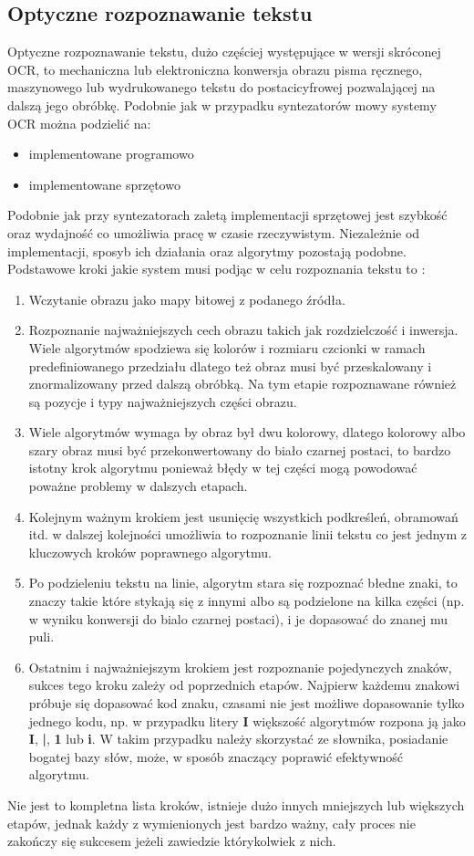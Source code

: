 \subsection{Optyczne rozpoznawanie tekstu}
Optyczne rozpoznawanie tekstu, dużo częściej występujące w wersji skróconej OCR, to mechaniczna lub elektroniczna konwersja obrazu pisma ręcznego, maszynowego lub wydrukowanego tekstu do postacicyfrowej pozwalającej na dalszą jego obróbkę. Podobnie jak w przypadku syntezatorów mowy systemy OCR można podzielić na:
\begin{itemize}
	\item implementowane programowo
	\item implementowane sprzętowo
\end{itemize}
Podobnie jak przy syntezatorach zaletą implementacji sprzętowej jest szybkość oraz wydajność co umożliwia pracę w czasie rzeczywistym. Niezależnie od implementacji, sposyb ich działania oraz algorytmy pozostają podobne. Podstawowe kroki jakie system musi podjąc w celu rozpoznania tekstu to \cite{noor2005} :
\begin{enumerate}
	\item Wczytanie obrazu jako mapy bitowej z podanego źródła.
	\item Rozpoznanie najważniejszych cech obrazu takich jak rozdzielczość i inwersja. Wiele algorytmów spodziewa się kolorów i rozmiaru czcionki w ramach predefiniowanego przedziału dlatego też obraz musi być przeskalowany i znormalizowany przed dalszą obróbką. Na tym etapie rozpoznawane również są pozycje i typy najważniejszych części obrazu.
	\item Wiele algorytmów wymaga by obraz był dwu kolorowy, dlatego kolorowy albo szary obraz musi być przekonwertowany do biało czarnej postaci, to bardzo istotny krok algorytmu ponieważ błędy w tej części mogą powodować poważne problemy w dalszych etapach.
	\item Kolejnym ważnym krokiem jest usunięcię wszystkich podkreśleń, obramowań itd. w dalszej kolejności umożliwia to rozpoznanie linii tekstu co jest jednym z kluczowych kroków poprawnego algorytmu.
	\item Po podzieleniu tekstu na linie, algorytm stara się rozpoznać błedne znaki, to znaczy takie które stykają się z innymi albo są podzielone na kilka części (np. w wyniku konwersji do bialo czarnej postaci), i je dopasować do znanej mu puli.
	\item Ostatnim i najważniejszym krokiem jest rozpoznanie pojedynczych znaków, sukces tego kroku zależy od poprzednich etapów. Najpierw każdemu znakowi próbuje się dopasować kod znaku, czasami nie jest możliwe dopasowanie tylko jednego kodu, np. w przypadku litery \textbf{I} większość algorytmów rozpona ją jako \textbf{I}, \textbf{|}, \textbf{1} lub \textbf{i}. W takim przypadku należy skorzystać ze słownika, posiadanie bogatej bazy słów, może, w sposób znaczący poprawić efektywność algorytmu.
\end{enumerate}
Nie jest to kompletna lista kroków, istnieje dużo innych mniejszych lub większych etapów, jednak każdy z wymienionych jest bardzo ważny, cały proces nie zakończy się sukcesem jeżeli zawiedzie którykolwiek z nich. 
